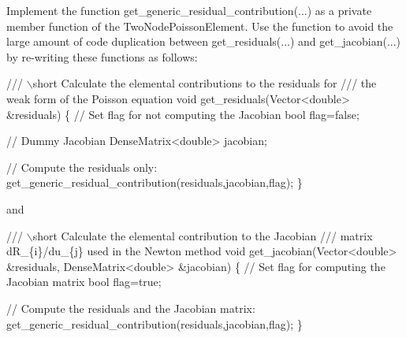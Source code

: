 \begin{DoxyItemize}
\item Implement the function {\ttfamily get\+\_\+generic\+\_\+residual\+\_\+contribution}(...) as a private member function of the {\ttfamily Two\+Node\+Poisson\+Element}. Use the function to avoid the large amount of code duplication between {\ttfamily get\+\_\+residuals}(...) and {\ttfamily get\+\_\+jacobian}(...) by re-\/writing these functions as follows\+: 
\begin{DoxyCode}
\textcolor{comment}{/// \(\backslash\)short Calculate the elemental contributions to the residuals for }
\textcolor{comment}{}\textcolor{comment}{/// the weak form of the Poisson equation}
\textcolor{comment}{}\textcolor{keywordtype}{void} get\_residuals(Vector<double> &residuals)
 \{
  \textcolor{comment}{// Set flag for not computing the Jacobian}
  \textcolor{keywordtype}{bool} flag=\textcolor{keyword}{false};

  \textcolor{comment}{// Dummy Jacobian}
  DenseMatrix<double> jacobian;

  \textcolor{comment}{// Compute the residuals only:}
  get\_generic\_residual\_contribution(residuals,jacobian,flag);
 \}
\end{DoxyCode}
 and 
\begin{DoxyCode}
\textcolor{comment}{/// \(\backslash\)short Calculate the elemental contribution to the Jacobian }
\textcolor{comment}{}\textcolor{comment}{/// matrix dR\_\{i\}/du\_\{j\} used in the Newton method}
\textcolor{comment}{}\textcolor{keywordtype}{void} get\_jacobian(Vector<double> &residuals, DenseMatrix<double> &jacobian)
 \{
  \textcolor{comment}{// Set flag for computing the Jacobian matrix}
  \textcolor{keywordtype}{bool} flag=\textcolor{keyword}{true};

  \textcolor{comment}{// Compute the residuals and the Jacobian matrix:}
  get\_generic\_residual\_contribution(residuals,jacobian,flag);
 \}
\end{DoxyCode}


\end{DoxyItemize}
